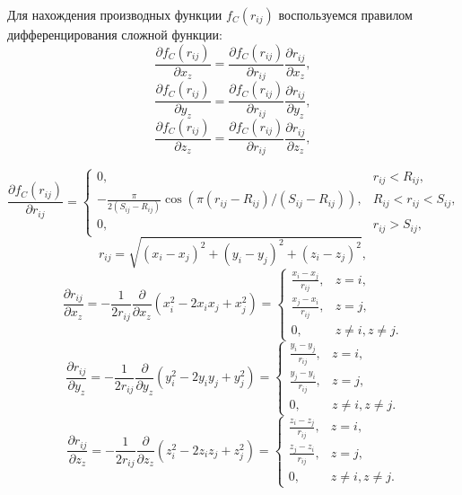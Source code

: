 Для нахождения производных функции $f_C(r_{ij})$ воспользуемся правилом дифференцирования сложной функции:
\begin{equation}
\frac{\partial f_C(r_{ij})}{\partial x_z} =  \frac{\partial f_C(r_{ij})}{\partial r_{ij}}\frac{\partial r_{ij}}{\partial x_z},
\end{equation}
\begin{equation}
\frac{\partial f_C(r_{ij})}{\partial y_z} =  \frac{\partial f_C(r_{ij})}{\partial r_{ij}}\frac{\partial r_{ij}}{\partial y_z},
\end{equation}
\begin{equation}
\frac{\partial f_C(r_{ij})}{\partial z_z} =  \frac{\partial f_C(r_{ij})}{\partial r_{ij}}\frac{\partial r_{ij}}{\partial z_z},
\end{equation}

\[
\frac{\partial f_C(r_{ij})}{\partial r_{ij}} =
\begin{cases}
0, &\text{$r_{ij} < R_{ij}$,}\\
- \frac{\pi}{2(S_{ij} - R_{ij})}\cos \left(\pi (r_{ij} - R_{ij}) / (S_{ij} - R_{ij})\right), &\text{$R_{ij}< r_{ij} < S_{ij}$,}\\
0, &\text{$r_{ij} > S_{ij}$,}
\end{cases}
\]
\begin{equation}
r_{ij} = \sqrt{(x_i - x_j)^2 + (y_i - y_j)^2 + (z_i - z_j)^2},
\end{equation}
\[
\frac{\partial r_{ij}}{\partial x_z} =-\frac{1}{2 r_{ij}}\frac{\partial}{\partial x_z}\left(x^2_i - 2 x_i x_j + x^2_j\right) = 
\begin{cases}
\frac{x_i - x_j}{r_{ij}}, &\text{$z = i$,}\\
\frac{x_j - x_i}{r_{ij}}, &\text{$z = j$,}\\
0, &\text{$z \neq i, z \neq j$.}
\end{cases}
\]
\[
\frac{\partial r_{ij}}{\partial y_z} =-\frac{1}{2 r_{ij}}\frac{\partial}{\partial y_z}\left(y^2_i - 2 y_i y_j + y^2_j\right) = 
\begin{cases}
\frac{y_i - y_j}{r_{ij}}, &\text{$z = i$,}\\
\frac{y_j - y_i}{r_{ij}}, &\text{$z = j$,}\\
0, &\text{$z \neq i, z \neq j$.}
\end{cases}
\]
\[
\frac{\partial r_{ij}}{\partial z_z} =-\frac{1}{2 r_{ij}}\frac{\partial}{\partial z_z}\left(z^2_i - 2 z_i z_j + z^2_j\right) = 
\begin{cases}
\frac{z_i - z_j}{r_{ij}}, &\text{$z = i$,}\\
\frac{z_j - z_i}{r_{ij}}, &\text{$z = j$,}\\
0, &\text{$z \neq i, z \neq j$.}
\end{cases}
\]

